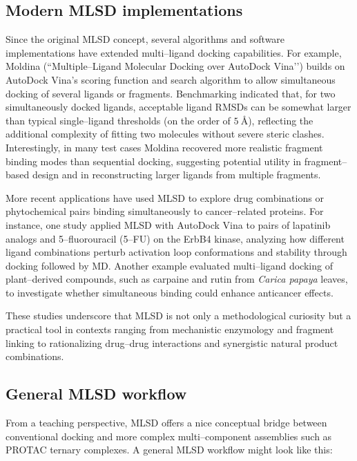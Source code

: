 \documentclass[12pt]{article}
\begin{document}
\subsection{Modern MLSD implementations}

Since the original MLSD concept, several algorithms and software implementations have extended multi–ligand docking capabilities.  
For example, Moldina (“Multiple–Ligand Molecular Docking over AutoDock Vina’’) builds on AutoDock Vina’s scoring function and search algorithm to allow simultaneous docking of several ligands or fragments.\cite{CH14_Moldina2025} 
Benchmarking indicated that, for two simultaneously docked ligands, acceptable ligand RMSDs can be somewhat larger than typical single–ligand thresholds (on the order of \(5~\text{\AA}\)), reflecting the additional complexity of fitting two molecules without severe steric clashes.
Interestingly, in many test cases Moldina recovered more realistic fragment binding modes than sequential docking, suggesting potential utility in fragment–based design and in reconstructing larger ligands from multiple fragments.\cite{CH14_Moldina2025} 

More recent applications have used MLSD to explore drug combinations or phytochemical pairs binding simultaneously to cancer–related proteins.  
For instance, one study applied MLSD with AutoDock Vina to pairs of lapatinib analogs and 5–fluorouracil (5–FU) on the ErbB4 kinase, analyzing how different ligand combinations perturb activation loop conformations and stability through docking followed by MD.\cite{CH14_ErbB4MLSD2024} %
Another example evaluated multi–ligand docking of plant–derived compounds, such as carpaine and rutin from \emph{Carica papaya} leaves, to investigate whether simultaneous binding could enhance anticancer effects.\cite{CH14_PapayaMultiLigand2025}

These studies underscore that MLSD is not only a methodological curiosity but a practical tool in contexts ranging from mechanistic enzymology and fragment linking to rationalizing drug–drug interactions and synergistic natural product combinations.

\subsection{General MLSD workflow}

From a teaching perspective, MLSD offers a nice conceptual bridge between conventional docking and more complex multi–component assemblies such as PROTAC ternary complexes.  
A general MLSD workflow might look like this:
\end{document}
